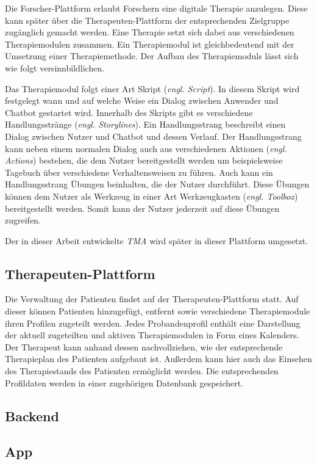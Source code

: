 Die Forscher-Plattform erlaubt Forschern eine digitale Therapie anzulegen. Diese kann später über die Therapeuten-Plattform der entsprechenden Zielgruppe zugänglich gemacht werden. Eine Therapie setzt sich dabei aus verschiedenen Therapiemodulen zusammen. Ein Therapiemodul ist gleichbedeutend mit der Umsetzung einer Therapiemethode. Der Aufbau des Therapiemoduls lässt sich wie folgt versinnbildlichen.

Das Therapiemodul folgt einer Art Skript (\emph{engl. Script}). In diesem Skript wird festgelegt wann und auf welche Weise ein Dialog zwischen Anwender und Chatbot gestartet wird. Innerhalb des Skripts gibt es verschiedene Handlungsstränge (\emph{engl. Storylines}). Ein Handlungsstrang beschreibt einen Dialog zwischen Nutzer und Chatbot und dessen Verlauf. Der Handlungsstrang kann neben einem normalen Dialog auch aus verschiedenen Aktionen (\emph{engl. Actions}) bestehen, die dem Nutzer bereitgestellt werden um beispielsweise Tagebuch über verschiedene Verhaltensweisen zu führen. Auch kann ein Handlungsstrang Übungen beinhalten, die der Nutzer durchführt. Diese Übungen können dem Nutzer als Werkzeug in einer Art Werkzeugkasten (\emph{engl. Toolbox}) bereitgestellt werden. Somit kann der Nutzer jederzeit auf diese Übungen zugreifen.

Der in dieser Arbeit entwickelte \emph{TMA} wird später in dieser Plattform umgesetzt.  


\subsection{Therapeuten-Plattform}
Die Verwaltung der Patienten findet auf der Therapeuten-Plattform statt. Auf dieser können Patienten hinzugefügt, entfernt sowie verschiedene Therapiemodule ihren Profilen zugeteilt werden. Jedes Probandenprofil enthält eine Darstellung der aktuell zugeteilten und aktiven Therapiemodulen in Form eines Kalenders. Der Therapeut kann anhand dessen nachvollziehen, wie der entsprechende Therapieplan des Patienten aufgebaut ist. Außerdem kann hier auch das Einsehen des Therapiestands des Patienten ermöglicht werden. Die entsprechenden Profildaten werden in einer zugehörigen Datenbank gespeichert.


\subsection{Backend}



\subsection{App}



